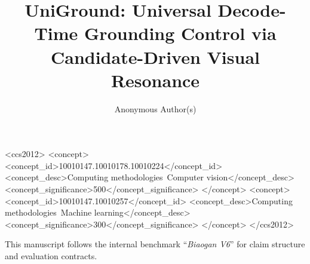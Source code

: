 \documentclass[sigconf]{acmart}
\begin{document}
\title{UniGround: Universal Decode-Time Grounding Control via Candidate-Driven Visual Resonance}

\author{Anonymous Author(s)}

\renewcommand{\shortauthors}{Anonymous et al.}

\begin{abstract}

\end{abstract}

\begin{CCSXML}
<ccs2012>
 <concept>
  <concept_id>10010147.10010178.10010224</concept_id>
  <concept_desc>Computing methodologies~Computer vision</concept_desc>
  <concept_significance>500</concept_significance>
 </concept>
 <concept>
  <concept_id>10010147.10010257</concept_id>
  <concept_desc>Computing methodologies~Machine learning</concept_desc>
  <concept_significance>300</concept_significance>
 </concept>
</ccs2012>
\end{CCSXML}



\maketitle



\begin{acks}
This manuscript follows the internal benchmark ``\emph{Biaogan V6}'' for claim structure and evaluation contracts.
\end{acks}



\end{document}
